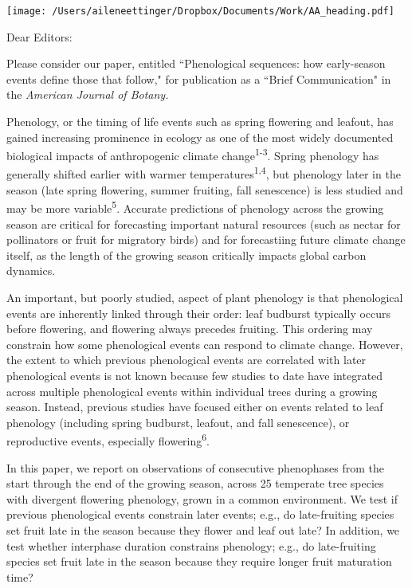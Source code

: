 \documentclass[10.95pt,a4paper]{letter}
\date{March 21, 2018}
\begin{document}
%

\begin{letter}{}
\texttt{[image: /Users/aileneettinger/Dropbox/Documents/Work/AA\_heading.pdf]}

\opening{Dear Editors:}
Please consider our paper, entitled ``Phenological sequences: how early-season events define those that follow," for publication as a ``Brief Communication" in the \emph{American Journal of Botany.}

Phenology, or the timing of life events such as spring flowering and leafout, has gained increasing prominence in ecology as one of the most widely documented biological impacts of anthropogenic climate change\textsuperscript{1-3}. Spring phenology has generally shifted earlier with warmer temperatures\textsuperscript{1,4}, but phenology later in the season (late spring flowering, summer fruiting, fall senescence) is less studied and may be more variable\textsuperscript{5}. Accurate predictions of phenology across the growing season are critical for forecasting important natural resources (such as nectar for pollinators or fruit for migratory birds) and for forecastiing future climate change itself, as the length of the growing season critically impacts global carbon dynamics. 

An important, but poorly studied, aspect of plant phenology is that phenological events are inherently linked through their order: leaf budburst typically occurs before flowering, and flowering always precedes fruiting. This ordering may constrain how some phenological events can respond to climate change. However, the extent to which previous phenological events are correlated with later phenological events is not known because few studies to date have integrated across multiple phenological events within individual trees during a growing season. Instead, previous studies have focused either on events related to leaf phenology (including spring budburst, leafout, and fall senescence), or reproductive events, especially flowering\textsuperscript{6}. 


In this paper, we report on observations of consecutive phenophases from the start through the end of the growing season, across 25 temperate tree species with divergent flowering phenology, grown in a common environment. We test if previous phenological events constrain later events; e.g., do late-fruiting species set fruit late in the season because they flower and leaf out late? In addition, we test whether interphase duration constrains phenology; e.g., do late-fruiting species set fruit late in the season because they require longer fruit maturation time? 


\end{letter}
\end{document}
